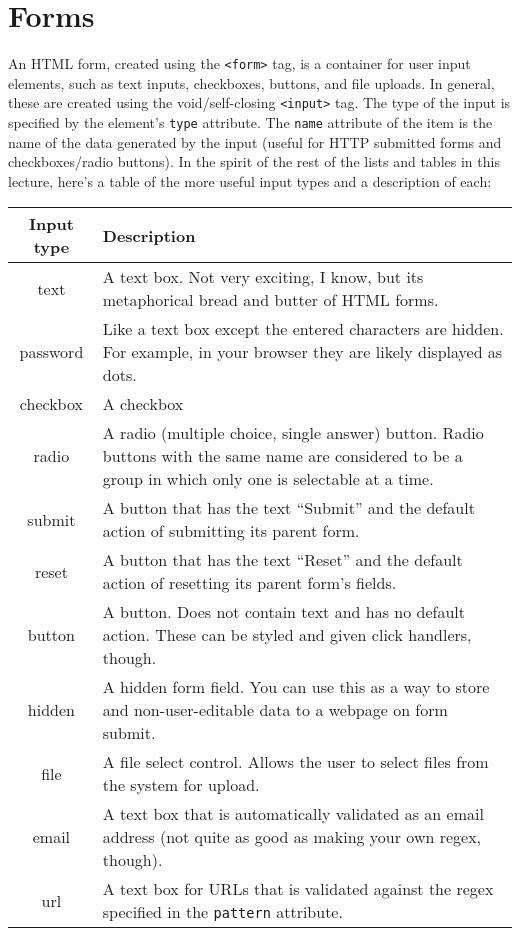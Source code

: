 \documentclass[12pt]{article}
\begin{document}
\section{Forms}
An HTML form, created using the \texttt{<form>} tag, is a container for user input elements, such as text inputs, checkboxes, buttons, and file uploads. In general, these are created using the void/self-closing \texttt{<input>} tag. The type of the input is specified by the element's \texttt{type} attribute. The \texttt{name} attribute of the item is the name of the data generated by the input (useful for HTTP submitted forms and checkboxes/radio buttons). In the spirit of the rest of the lists and tables in this lecture, here's a table of the more useful input types and a description of each:
\begin{center}
  \begin{tabular}{| c | p{10.4cm} |}
    \hline
    \textbf{Input type} & \textbf{Description} \\
    \hline
    text & A text box. Not very exciting, I know, but its
           metaphorical bread and butter of HTML forms. \\
    \hline
    password & Like a text box except the entered characters
               are hidden. For example, in your browser they are likely displayed as dots.  \\
    \hline
    checkbox & A checkbox \\
    \hline
    radio & A radio (multiple choice, single answer) button.
            Radio buttons with the same name are considered to be a group in which only one is selectable at a time. \\
    \hline 
    submit & A button that has the text ``Submit'' and the
             default action of submitting its parent form. \\
    \hline
    reset & A button that has the text ``Reset'' and the
            default action of resetting its parent form's fields. \\
    \hline
    button & A button. Does not contain text and has no
             default action. These can be styled and given click handlers, though. \\
    \hline
    hidden & A hidden form field. You can use this as a way
             to store and non-user-editable data to a webpage on form submit. \\
    \hline
    file & A file select control. Allows the user to select
           files from the system for upload. \\
    \hline
    email & A text box that is automatically validated as
            an email address (not quite as good as making your own regex, though). \\
    \hline
    url & A text box for URLs that is validated against
          the regex specified in the \texttt{pattern} attribute. \\
    \hline
  \end{tabular}
\end{center}
\end{document}
